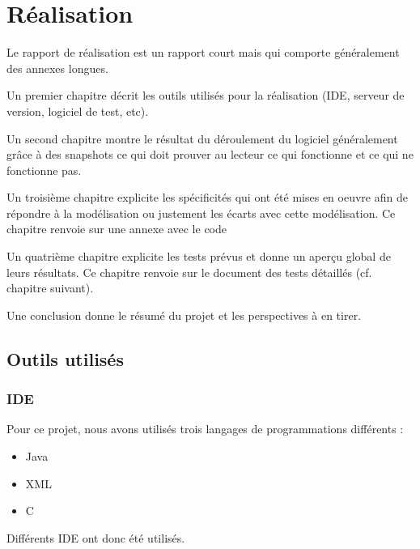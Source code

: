 	
	\part{Réalisation}
	
	\setcounter{chapter}{0} %
	\setcounter{section}{0} %
	
	\renewcommand*{\theHchapter}{\thepart.\thechapter}

Le rapport de réalisation est un rapport court mais qui comporte généralement des annexes longues.

Un premier chapitre décrit les outils utilisés pour la réalisation (IDE, serveur de version, logiciel de test, etc).

Un second chapitre montre le résultat du déroulement du logiciel généralement grâce à des snapshots ce qui doit prouver au lecteur ce qui fonctionne et ce qui ne fonctionne pas.

Un troisième chapitre explicite les spécificités qui ont été mises en oeuvre afin de répondre à la modélisation ou justement les écarts avec cette modélisation. Ce chapitre renvoie sur une annexe avec le code

Un quatrième chapitre explicite les tests prévus et donne un aperçu global de leurs résultats. Ce chapitre renvoie sur le document des tests détaillés (cf. chapitre suivant).

Une conclusion donne le résumé du projet et les perspectives à en tirer.

		\chapter{Outils utilisés}
		
		\section{IDE}
		Pour ce projet, nous avons utilisés trois langages de programmations différents :
		\begin{itemize}
			\item Java
			\item XML
			\item C
		\end{itemize}
		Différents IDE ont donc été utilisés.
		
